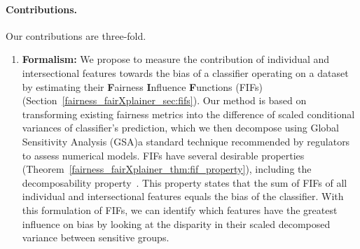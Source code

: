 \paragraph{Contributions.}  Our contributions are three-fold.

\begin{enumerate}
	
	\item \textbf{Formalism:} We propose to measure the contribution of individual and intersectional features towards the bias of a classifier operating on a dataset by estimating their \textbf{F}airness \textbf{I}nfluence \textbf{F}unctions (FIFs) (Section~\ref{fairness_fairXplainer_sec:fifs}). Our method is based on transforming existing fairness metrics into the difference of scaled conditional variances of classifier's prediction, which we then decompose using Global Sensitivity Analysis (GSA)\textemdash a standard technique recommended by regulators to assess numerical models\cite{eu,usepa}. FIFs have several desirable properties (Theorem~\ref{fairness_fairXplainer_thm:fif_property}), including the decomposability property~\cite{begley2020explainability,lundberg2020explaining}. This property states that the sum of FIFs of all individual and intersectional features equals the bias of the classifier. With this formulation of FIFs, we can identify which features have the greatest influence on bias by looking at the disparity in their scaled decomposed variance between sensitive groups.
	
	

\end{enumerate}
